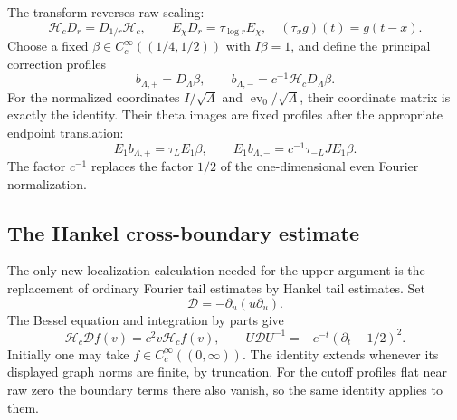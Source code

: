 The transform reverses raw scaling:
\[
 \mathcal H_cD_r=D_{1/r}\mathcal H_c,
 \qquad E_\chi D_r=\tau_{\log r}E_\chi,
 \quad (\tau_xg)(t)=g(t-x).
\]
Choose a fixed $\beta\in C_c^\infty((1/4,1/2))$ with $I\beta=1$,
and define the principal correction profiles
\begin{equation}\label{eq:hi-principal-profiles}
 b_{\Lambda,+}=D_\Lambda\beta,
 \qquad b_{\Lambda,-}=c^{-1}\mathcal H_cD_\Lambda\beta.
\end{equation}
For the normalized coordinates $I/\sqrt\Lambda$ and
$\operatorname{ev}_0/\sqrt\Lambda$, their coordinate matrix is exactly
the identity. Their theta images are fixed profiles after the appropriate
endpoint translation:
\[
 E_1b_{\Lambda,+}=\tau_LE_1\beta,
 \qquad E_1b_{\Lambda,-}=c^{-1}\tau_{-L}J E_1\beta.
\]
The factor $c^{-1}$ replaces the factor $1/2$ of the one-dimensional
even Fourier normalization.

\subsection{The Hankel cross-boundary estimate}

The only new localization calculation needed for the upper argument is
the replacement of ordinary Fourier tail estimates by Hankel tail
estimates. Set
\[
                  \mathcal D=-\partial_u(u\partial_u).
\]
The Bessel equation and integration by parts give
\begin{equation}\label{eq:hi-radial-diagonalization}
 \mathcal H_c\mathcal D f(v)=c^2v\mathcal H_cf(v),
 \qquad
 U\mathcal DU^{-1}=-e^{-t}(\partial_t-1/2)^2.
\end{equation}
Initially one may take $f\in C_c^\infty((0,\infty))$. The identity
extends whenever its displayed graph norms are finite, by truncation.
For the cutoff profiles flat near raw zero the boundary terms there also
vanish, so the same identity applies to them.

